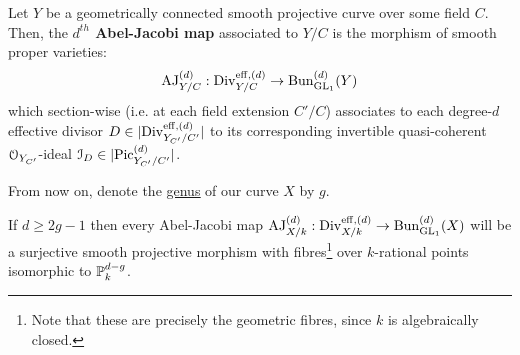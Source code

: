             \begin{definition} \label{def: the_abel_jacobi_map}
                Let $Y$ be a geometrically connected smooth projective curve over some field $C$. Then, the \textbf{$d^{th}$ Abel-Jacobi map} associated to $Y/C$ is the morphism of smooth proper varieties:
                    $$\AJ_{Y/C}^{(d)}: \Div_{Y/C}^{\eff, (d)} \to \Bun_{\GL_1}^{(d)}(Y)$$
                which section-wise (i.e. at each field extension $C'/C$) associates to each degree-$d$ effective divisor $D \in |\Div_{Y_{C'}/C'}^{\eff, (d)}|$ to its corresponding invertible quasi-coherent $\calO_{Y_{C'}}$-ideal $\calI_D \in |\Pic_{Y_{C'}/C'}^{(d)}|$.
            \end{definition}
            \begin{remark} \label{remark: abel_jacobi_map}
                
            \end{remark}
            \begin{convention} \label{conv: genus_of_the_curve}
                From now on, denote the \href{https://stacks.math.columbia.edu/tag/0BY6}{\underline{genus}} of our curve $X$ by $g$.
            \end{convention}
            \begin{proposition} \label{prop: the_unramified_abel_jacobi_map_is_a_projective_bundle}
                If $d \geq 2g - 1$ then every Abel-Jacobi map $\AJ_{X/k}^{(d)}: \Div_{X/k}^{\eff, (d)} \to \Bun_{\GL_1}^{(d)}(X)$ will be a surjective smooth projective morphism with fibres\footnote{Note that these are precisely the geometric fibres, since $k$ is algebraically closed.} over $k$-rational points isomorphic to $\P^{d - g}_k$.
            \end{proposition}

